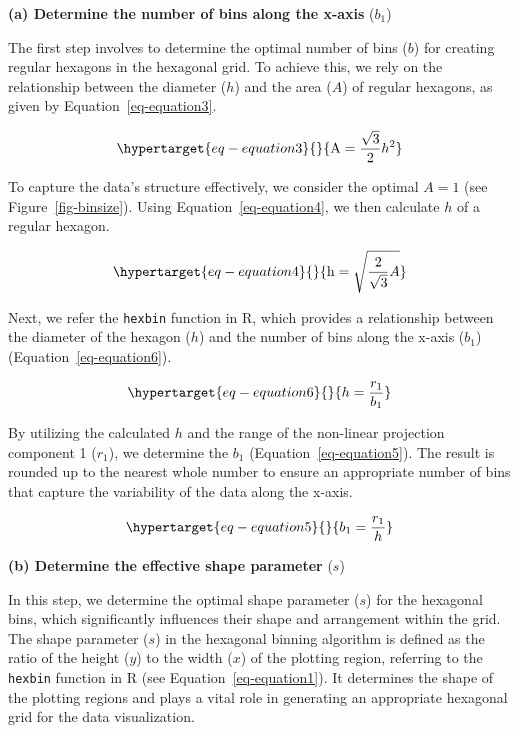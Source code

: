 \documentclass[
  12pt]{article}
\begin{document}
\textbf{(a) Determine the number of bins along the x-axis} (\(b_1\))

The first step involves to determine the optimal number of bins (\(b\))
for creating regular hexagons in the hexagonal grid. To achieve this, we
rely on the relationship between the diameter (\(h\)) and the area
(\(A\)) of regular hexagons, as given by Equation~\ref{eq-equation3}.

\begin{equation}\protect\hypertarget{eq-equation3}{}{
 \text{A} = \frac{\sqrt{3}}{2}h^2
}\label{eq-equation3}\end{equation}

To capture the data's structure effectively, we consider the optimal
\(A = 1\) (see Figure~\ref{fig-binsize}). Using
Equation~\ref{eq-equation4}, we then calculate \(h\) of a regular
hexagon.

\begin{equation}\protect\hypertarget{eq-equation4}{}{
 \text{h} = \sqrt{\frac{2}{\sqrt{3}}A}
}\label{eq-equation4}\end{equation}

Next, we refer the \texttt{hexbin} function in R, which provides a
relationship between the diameter of the hexagon (\(h\)) and the number
of bins along the x-axis (\(b_1\)) (Equation~\ref{eq-equation6}).

\begin{equation}\protect\hypertarget{eq-equation6}{}{
 h = \frac{r_1}{b_1}
}\label{eq-equation6}\end{equation}

By utilizing the calculated \(h\) and the range of the non-linear
projection component 1 (\(r_1\)), we determine the \(b_1\)
(Equation~\ref{eq-equation5}). The result is rounded up to the nearest
whole number to ensure an appropriate number of bins that capture the
variability of the data along the x-axis.

\begin{equation}\protect\hypertarget{eq-equation5}{}{
 b_1 = \frac{r_1}{h}
}\label{eq-equation5}\end{equation}

\textbf{(b) Determine the effective shape parameter} (\(s\))

In this step, we determine the optimal shape parameter (\(s\)) for the
hexagonal bins, which significantly influences their shape and
arrangement within the grid. The shape parameter (\(s\)) in the
hexagonal binning algorithm is defined as the ratio of the height
(\(y\)) to the width (\(x\)) of the plotting region, referring to the
\texttt{hexbin} function in R (see Equation~\ref{eq-equation1}). It
determines the shape of the plotting regions and plays a vital role in
generating an appropriate hexagonal grid for the data visualization.
\end{document}
